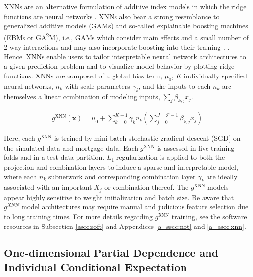 \documentclass[information,article,submit,moreauthors,pdftex]{definitions/mdpi}
\begin{document}
XNNs are an alternative formulation of additive index models in which the ridge functions are neural networks \cite{wf_xnn}. XNNs also bear a strong resemblance to generalized additive models (GAMs) and so-called explainable boosting machines (EBMs or GA\textsuperscript{2}M), i.e., GAMs which consider main effects and a small number of 2-way interactions and may also incorporate boosting into their training \cite{esl}, \cite{ga2m}.  Hence, XNNs enable users to tailor interpretable neural network architectures to a given prediction problem and to visualize model behavior by plotting ridge functions. XNNs are composed of a global bias term, $\mu_0$, $K$ individually specified neural networks, $n_k$ with scale parameters $\gamma_k$, and the inputs to each $n_k$ are themselves a linear combination of modeling inputs, $\sum_j\beta_{k,j}x_j$.

\begin{equation}
\begin{aligned}
\label{eq:xnn}
g^{\text{XNN}}(\mathbf{x}) = \mu_0 + \sum_{k=0}^{K-1}\gamma_k n_k(\sum^{J=\mathcal{P}-1}_{j=0}\beta_{k, j}x_j)
\end{aligned}
\end{equation}

Here, each $g^\text{XNN}$ is trained by mini-batch stochastic gradient descent (SGD) on the simulated data and mortgage data. Each $g^\text{XNN}$ is assessed in five training folds and in a test data partition. $L_1$ regularization is applied to both the projection and combination layers to induce a sparse and interpretable model, where each $n_k$ subnetwork and corresponding combination layer $\gamma_k$ are ideally associated with an important $X_j$ or combination thereof. The $g^\text{XNN}$ models appear highly sensitive to weight initialization and batch size. Be aware that $g^{XNN}$ model architectures may require manual and judicious feature selection due to long training times. For more details regarding $g^\text{XNN}$ training, see the software resources in Subsection \ref{ssec:soft} and Appendices  \ref{a_ssec:not} and \ref{a_ssec:xnn}.

\subsection{One-dimensional Partial Dependence and Individual Conditional Expectation}\label{ssec:pd_ice}
\end{document}
